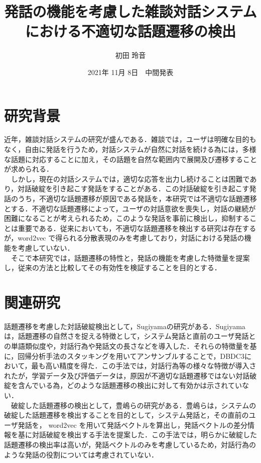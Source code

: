 \documentclass[upLaTex, 10pt,dvipdfmx,a4paper,twocolumn]{jsarticle}
\begin{document}
\title{発話の機能を考慮した雑談対話システムにおける不適切な話題遷移の検出}
\author{初田 玲音}
\date{2021年 11月 8日　中間発表}


\maketitle

\section{研究背景}
    近年，雑談対話システムの研究が盛んである．雑談では，ユーザは明確な目的もなく，自由に発話を行うため，対話システムが自然に対話を続ける為には，多様な話題に対応することに加え，その話題を自然な範囲内で展開及び遷移することが求められる．\\
    　しかし，現在の対話システムでは，適切な応答を出力し続けることは困難であり，対話破綻を引き起こす発話をすることがある．この対話破綻を引き起こす発話のうち，不適切な話題遷移が原因である発話を，本研究では不適切な話題遷移とする．不適切な話題遷移によって，ユーザの対話意欲を喪失し，対話の継続が困難になることが考えられるため，このような発話を事前に検出し，抑制することは重要である．従来においても，不適切な話題遷移を検出する研究は存在するが，word2vec\cite{w2v} で得られる分散表現のみを考慮しており，対話における発話の機能を考慮していない．\\
    　そこで本研究では，話題遷移の特性と，発話の機能を考慮した特徴量を提案し，従来の方法と比較してその有効性を検証することを目的とする．
    　
\section{関連研究}
    話題遷移を考慮した対話破綻検出として，Sugiyama\cite{sugiyama}の研究がある．Sugiyama は，話題遷移の自然さを捉える特徴として，システム発話と直前のユーザ発話との単語類似度や，対話行為や発話文の長さなどを導入した．それらの特徴量を基に，回帰分析手法のスタッキングを用いてアンサンブルすることで，DBDC3において，最も高い精度を得た．この手法では，対話行為等の様々な特徴が導入されたが，学習データ及び評価データは，原因が不適切な話題遷移ではない対話破綻を含んでいる為，どのような話題遷移の検出に対して有効かは示されていない．\\
    　破綻した話題遷移の検出として，豊嶋ら\cite{toyoshima}の研究がある．豊嶋らは，システムの破綻した話題遷移を検出することを目的として，システム発話と，その直前のユーザ発話を， word2vec を用いて発話ベクトルを算出し，発話ベクトルの差分情報を基に対話破綻を検出する手法を提案した．この手法では，明らかに破綻した話題遷移の検出率は高いが，発話ベクトルのみを考慮しているため，対話行為のような発話の役割については考慮されていない．\\
\end{document}
